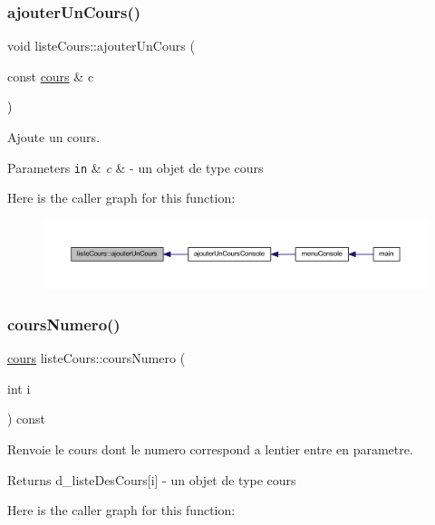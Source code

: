 \subsubsection{\texorpdfstring{ajouter\+Un\+Cours()}{ajouterUnCours()}}
{\footnotesize\ttfamily void liste\+Cours\+::ajouter\+Un\+Cours (\begin{DoxyParamCaption}\item[{const \hyperlink{classcours}{cours} \&}]{c }\end{DoxyParamCaption})}



Ajoute un cours. 


\begin{DoxyParams}[1]{Parameters}
\mbox{\tt in}  & {\em c} & -\/ un objet de type cours \\
\hline
\end{DoxyParams}
Here is the caller graph for this function\+:\nopagebreak
\begin{figure}[H]
\begin{center}
\leavevmode
\includegraphics[width=350pt]{classliste_cours_aacc38305cfea76d8cc77d710d144ce8b_icgraph}
\end{center}
\end{figure}
\hypertarget{classliste_cours_ac00615f15632669bf44424e960c95edd}{}\label{classliste_cours_ac00615f15632669bf44424e960c95edd} 
\subsubsection{\texorpdfstring{cours\+Numero()}{coursNumero()}}
{\footnotesize\ttfamily \hyperlink{classcours}{cours} liste\+Cours\+::cours\+Numero (\begin{DoxyParamCaption}\item[{int}]{i }\end{DoxyParamCaption}) const}



Renvoie le cours dont le numero correspond a l\textquotesingle{}entier entre en parametre. 

\begin{DoxyReturn}{Returns}
d\+\_\+liste\+Des\+Cours\mbox{[}i\mbox{]} -\/ un objet de type cours 
\end{DoxyReturn}
Here is the caller graph for this function\+:
\hypertarget{classliste_cours_a788e1017848b813a450a6156dd043a7a}{}\label{classliste_cours_a788e1017848b813a450a6156dd043a7a} 
